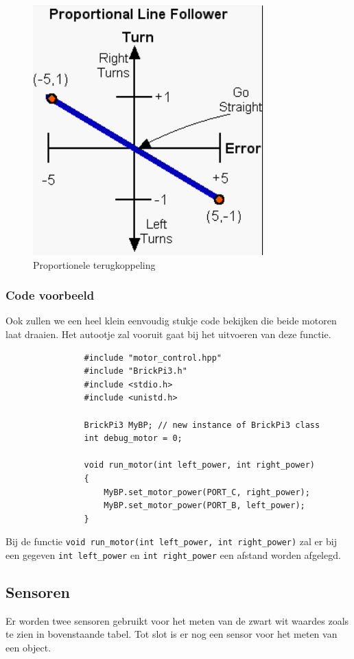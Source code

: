 \documentclass[12pt]{article}
\begin{document}
		\begin{center}
			\begin{figure}
				\includegraphics[scale=0.7]{proportional}
				\caption{Proportionele terugkoppeling}
			\end{figure}
		\end{center}
\newpage
		\subsubsection{Code voorbeeld}
			Ook zullen we een heel klein eenvoudig stukje code bekijken die beide motoren laat draaien. Het autootje zal vooruit gaat bij het uitvoeren van deze functie.
			\begin{lstlisting}
				#include "motor_control.hpp"
				#include "BrickPi3.h"
				#include <stdio.h>
				#include <unistd.h>
				
				BrickPi3 MyBP; // new instance of BrickPi3 class
				int debug_motor = 0;
				
				void run_motor(int left_power, int right_power)
				{
				    MyBP.set_motor_power(PORT_C, right_power);
				    MyBP.set_motor_power(PORT_B, left_power);
				}
			\end{lstlisting}
			Bij de functie \texttt{void run\_motor(int left\_power, int right\_power)} zal er bij een gegeven \texttt{int left\_power} en \texttt{int right\_power} een afstand worden afgelegd.
		
		
	\subsection{Sensoren}
		Er worden twee sensoren gebruikt voor het meten van de zwart wit waardes zoals te zien in bovenstaande tabel. Tot slot is er nog een sensor voor het meten van een object.
		
\end{document}
